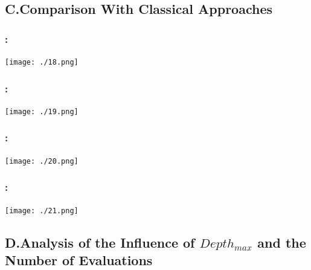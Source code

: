 \documentclass{beamer}
\begin{document}
\begin{CJK*}{UTF8}{bsmi}

\subsection{C.Comparison With Classical Approaches}


\begin{frame}
	\frametitle{\insertsection : \insertsubsection}
	\begin{center}
		\texttt{[image: ./18.png]}
	\end{center}
\end{frame}


\begin{frame}
	\frametitle{\insertsection : \insertsubsection}
	\begin{center}
		\texttt{[image: ./19.png]}
	\end{center}
\end{frame}


\begin{frame}
	\frametitle{\insertsection : \insertsubsection}
	\begin{center}
		\texttt{[image: ./20.png]}
	\end{center}
\end{frame}


\begin{frame}
	\frametitle{\insertsection : \insertsubsection}
	\begin{center}
		\texttt{[image: ./21.png]}
	\end{center}
\end{frame}


\subsection{D.Analysis of the Influence of $Depth_{max}$ and the Number of Evaluations}


\end{CJK*}
\end{document}
